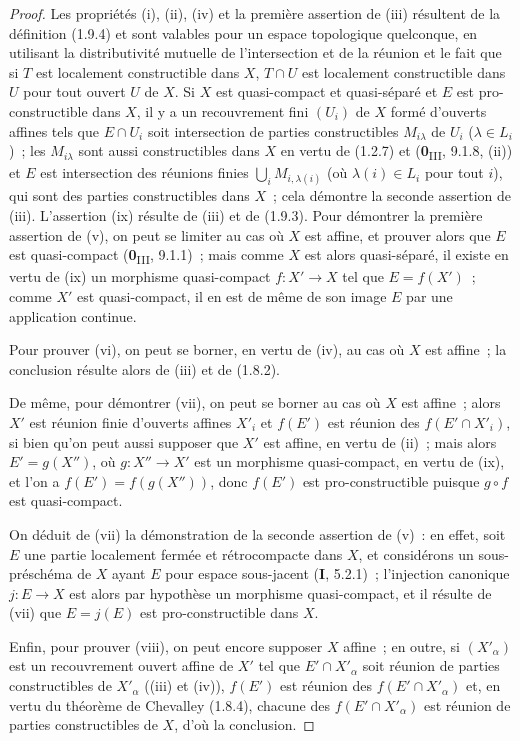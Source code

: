 \begin{proof}
Les propriétés (i), (ii), (iv) et la première assertion de (iii) résultent
de la définition (1.9.4) et sont valables pour un espace topologique
quelconque, en utilisant la distributivité mutuelle de l'intersection et de
la réunion et le fait que si $T$ est localement constructible dans $X$,
$T\cap U$ est localement constructible dans $U$ pour tout ouvert $U$ de $X$.
Si $X$ est quasi-compact et quasi-séparé et $E$ est pro-constructible dans
$X$, il y a un recouvrement fini $(U_i)$ de $X$ formé d'ouverts affines tels
que $E\cap U_i$ soit intersection de parties constructibles $M_{i\lambda}$
de $U_i$ ($\lambda\in L_i$)~; les $M_{i\lambda}$ sont aussi constructibles
dans $X$ en vertu de (1.2.7) et (\textbf{0}\textsubscript{III}, 9.1.8, (ii)) et $E$ est
intersection des réunions finies $\bigcup_iM_{i,\lambda(i)}$ (où
$\lambda(i)\in L_i$ pour tout $i$), qui sont des parties constructibles dans
$X$~; cela démontre la seconde assertion de (iii). L'assertion (ix) résulte
de (iii) et de (1.9.3). Pour démontrer la première assertion de (v), on peut
se limiter au cas où $X$ est affine, et prouver alors que $E$ est
quasi-compact (\textbf{0}\textsubscript{III}, 9.1.1)~; mais comme $X$ est alors
quasi-séparé, il existe en vertu de (ix) un morphisme quasi-compact
$f:X'\to X$ tel que $E=f(X')$~; comme $X'$ est quasi-compact, il en est de
même de son image $E$ par une application continue.

Pour prouver (vi), on peut se borner, en vertu de (iv), au cas où $X$ est
affine~; la conclusion résulte alors de (iii) et de (1.8.2).


De même, pour démontrer (vii), on peut se borner au cas où $X$ est affine~;
alors $X'$ est réunion finie d'ouverts affines $X'_i$ et $f(E')$ est réunion
des $f(E'\cap X'_i)$, si bien qu'on peut aussi supposer que $X'$ est affine,
en vertu de (ii)~; mais alors $E'=g(X'')$, où $g:X''\to X'$ est un morphisme
quasi-compact, en vertu de (ix), et l'on a $f(E')=f(g(X''))$, donc $f(E')$ est
pro-constructible puisque $g\circ f$ est quasi-compact.

On déduit de (vii) la démonstration de la seconde assertion de (v)~: en
effet, soit $E$ une partie localement fermée et rétrocompacte dans $X$, et
considérons un sous-préschéma de $X$ ayant $E$ pour espace sous-jacent (\textbf{I},
5.2.1)~; l'injection canonique $j:E\to X$ est alors par hypothèse un
morphisme quasi-compact, et il résulte de (vii) que $E=j(E)$ est
pro-constructible dans $X$.

Enfin, pour prouver (viii), on peut encore supposer $X$ affine~; en outre, si
$(X'_\alpha)$ est un recouvrement ouvert affine de $X'$ tel que
$E'\cap X'_\alpha$ soit réunion de parties constructibles de $X'_\alpha$
((iii) et (iv)), $f(E')$ est réunion des $f(E'\cap X'_\alpha)$ et, en vertu
du théorème de Chevalley (1.8.4), chacune des $f(E'\cap X'_\alpha)$ est
réunion de parties constructibles de $X$, d'où la conclusion.
\end{proof}

